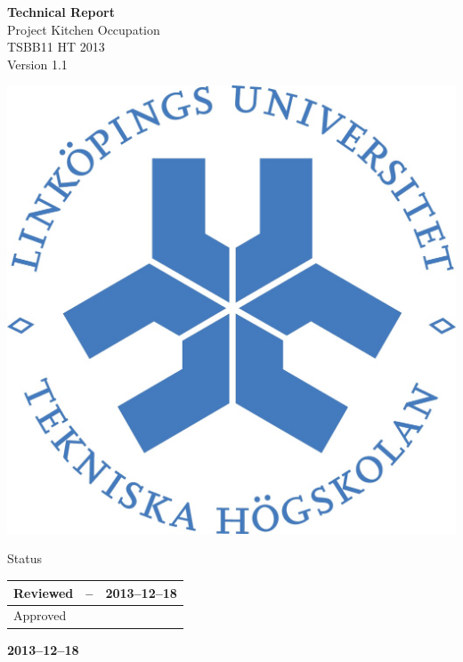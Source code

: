 \documentclass[pdftex, fontsize=11pt, a4paper]{scrbook}
\begin{document}
\begin{titlepage}
\thispagestyle{empty}
\begin{center}
	\vspace*{4\baselineskip}

	\textbf{\huge Technical Report} \\
	\vspace*{0.5\baselineskip}
	{\large  Project Kitchen Occupation} \\
	\vspace*{0.5\baselineskip}
	{\large  TSBB11 HT 2013} \\
	\vspace*{0.5\baselineskip}
	{\large  Version 1.1}


	\vspace*{6\baselineskip}
	\includegraphics[width=0.4\linewidth]{lith_sigill_col}


	\normalfont
	\small
	\vfill


	{\large  Status} \\
	\vspace*{1\baselineskip}
	\begin{tabular}{|p{4cm}|p{4cm}|p{4cm}|}
		\hline
		Reviewed & -- & 2013--12--18 \\
		\hline
		Approved &   &    \\
		\hline
	\end{tabular}


	\vspace*{2\baselineskip}

	\textbf{2013--12--18} \\
	[2\baselineskip]
\end{center}

\end{titlepage}
\end{document}
